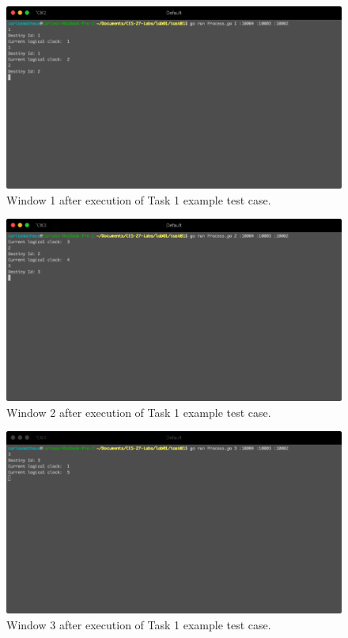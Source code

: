 \documentclass[a4paper, 11pt]{article}
\begin{document}
\begin{figure}[h]
  \begin{center}
  \includegraphics[width=5in]{./imgs/example_task1_window1.png}
  \caption{Window 1 after execution of Task 1 example test case.}
  \label{img_example_task1_window1}
  \end{center}
\end{figure}

\begin{figure}[h]
  \begin{center}
  \includegraphics[width=5in]{./imgs/example_task1_window2.png}
  \caption{Window 2 after execution of Task 1 example test case.}
  \label{img_example_task1_window2}
  \end{center}
\end{figure}

\begin{figure}[h]
  \begin{center}
  \includegraphics[width=5in]{./imgs/example_task1_window3.png}
  \caption{Window 3 after execution of Task 1 example test case.}
  \label{img_example_task1_window3}
  \end{center}
\end{figure}
\end{document}
